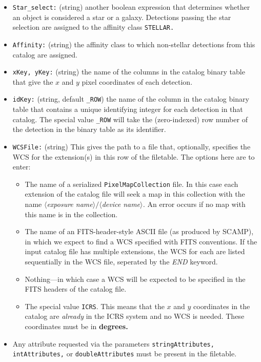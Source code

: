 \documentclass[11pt,preprint,flushrt]{aastex}
\begin{document}
\begin{itemize}
\item {\tt Star\_select:} (string) another boolean expression that determines whether an object is considered a star or a galaxy.  Detections passing the star selection are assigned to the affinity class {\tt STELLAR.}
\item {\tt Affinity:} (string) the affinity class to which non-stellar detections from this catalog are assigned.
\item {\tt xKey, yKey:} (string) the name of the columns in the catalog binary table that give the $x$ and $y$ pixel coordinates of each detection.
\item {\tt idKey:} (string, default {\tt \_ROW}) the name of the column in the catalog binary table that contains a unique identifying integer for each detection in that catalog.  The special value {\tt \_ROW} will take the (zero-indexed) row number of the detection in the binary table as its identifier.
\item {\tt WCSFile:} (string) This gives the path to a file that, optionally, specifies the WCS for the extension(s) in this row of the filetable.  The options here are to enter:
\begin{itemize}
\item The name of a serialized {\tt PixelMapCollection} file.  In this case each extension of the catalog file will seek a map in this collection with the name {\it $\langle$exposure name$\rangle / \langle$device name$\rangle$.}  An error occurs if no map with this name is in the collection.
\item The name of an FITS-header-style ASCII file (as produced by {\sc SCAMP}), in which we expect to find a WCS specified with FITS conventions.  If the input catalog file has multiple extensions, the WCS for each are listed sequentially in the WCS file, seperated by the {\it END} keyword.
\item Nothing---in which case a WCS will be expected to be specified in the FITS headers of the catalog file.
\item The special value {\tt ICRS}.  This  means that the $x$ and $y$ coordinates in the catalog are {\em already} in the ICRS system and no WCS is needed.  These coordinates must be in {\bf degrees.}
\end{itemize}
\item Any attribute requested via the parameters {\tt stringAttributes, intAttributes,} or {\tt doubleAttributes} must be present in the filetable.
\end{itemize}
\end{document}
